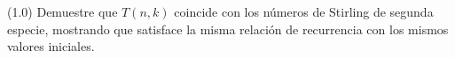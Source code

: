 (1.0) Demuestre que \(T(n,k)\) coincide con los números de Stirling de segunda especie, mostrando que satisface la misma relación de recurrencia con los mismos valores iniciales.